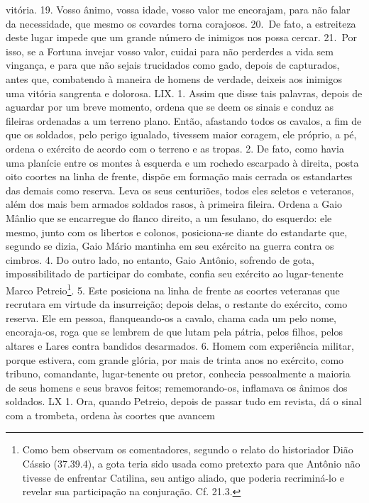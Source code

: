 vitória. 19. Vosso ânimo, vossa idade, vosso valor me encorajam, para não falar
da necessidade, que mesmo os covardes torna corajosos. 20.~De fato, a
estreiteza deste lugar impede que um grande número de inimigos nos possa
cercar. 21.~Por isso, se a Fortuna invejar vosso valor, cuidai para não
perderdes a vida sem vingança, e para que não sejais trucidados como gado,
depois de capturados, antes que, combatendo à maneira de homens de verdade,
deixeis aos inimigos uma vitória sangrenta e dolorosa.  LIX. 1. Assim que disse
tais palavras, depois de aguardar por um breve momento, ordena que se deem os
sinais e conduz as fileiras ordenadas a um terreno plano. Então, afastando
todos os cavalos, a fim de que os soldados, pelo perigo igualado, tivessem
maior coragem, ele próprio, a pé, ordena o exército de acordo com o terreno e
as tropas. 2. De fato, como havia uma planície entre os montes à esquerda e um
rochedo escarpado à direita, posta oito coortes na linha de frente, dispõe em
formação mais cerrada os estandartes das demais como reserva. Leva os seus
centuriões, todos eles seletos e veteranos, além dos mais bem armados soldados
rasos, à primeira fileira. Ordena a Gaio Mânlio que se encarregue do flanco
direito, a um fesulano, do esquerdo: ele mesmo, junto com os libertos e
colonos, posiciona-se diante do estandarte que, segundo se dizia, Gaio Mário
mantinha em seu exército na guerra contra os cimbros. 4. Do outro lado, no
entanto, Gaio Antônio, sofrendo de gota, impossibilitado de participar do
combate, confia seu exército ao lugar-tenente Marco Petreio\footnote{Como bem
observam os comentadores, segundo o relato do historiador Dião Cássio (37.39.4), a gota teria sido usada como pretexto para que Antônio não tivesse de
enfrentar Catilina, seu antigo aliado, que poderia recriminá-lo e revelar sua
participação na conjuração. Cf. 21.3.}. 5. Este posiciona na linha de frente
as coortes veteranas que recrutara em virtude da insurreição; depois delas, o
restante do exército, como reserva. Ele em pessoa, flanqueando-os a cavalo,
chama cada um pelo nome, encoraja-os, roga que se lembrem de que lutam pela pátria, pelos filhos, pelos altares e Lares contra
bandidos desarmados. 6. Homem
com experiência militar, porque estivera, com grande glória, por mais de trinta
anos no exército, como tribuno, comandante, lugar-tenente ou pretor, conhecia  pessoalmente a
maioria de seus homens e seus bravos feitos; rememorando-os,
inflamava os ânimos dos soldados.  LX 1. Ora, quando Petreio, depois de passar
tudo em revista, dá o sinal com a trombeta, ordena às coortes que avancem

